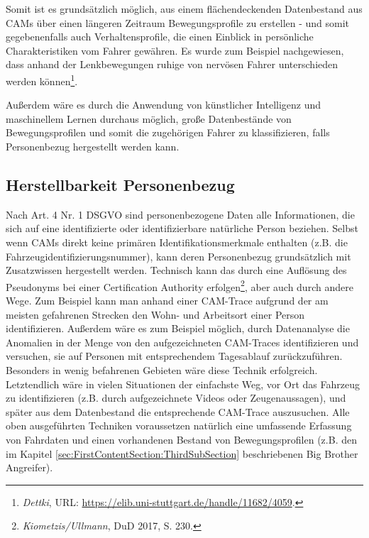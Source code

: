 Somit ist es grundsätzlich möglich, aus einem flächendeckenden Datenbestand aus CAMs über einen längeren Zeitraum Bewegungsprofile zu erstellen - und somit gegebenenfalls auch Verhaltensprofile, die einen Einblick in persönliche Charakteristiken vom Fahrer gewähren. Es\nocite{Dettki2005} wurde zum Beispiel nachgewiesen, dass anhand der Lenkbewegungen ruhige von nervösen Fahrer unterschieden werden können\footnote{\emph{Dettki}, URL: \url{https://elib.uni-stuttgart.de/handle/11682/4059}.}. 

Außerdem wäre es durch die Anwendung von künstlicher Intelligenz und maschinellem Lernen durchaus möglich, große Datenbestände von Bewegungsprofilen und somit die zugehörigen Fahrer zu klassifizieren, falls Personenbezug hergestellt werden kann. 


\subsection{Herstellbarkeit Personenbezug}
\label{sec:SecondContentSection:SecondSubsection:SecondSubSubsection}

Nach Art. 4 Nr. 1 DSGVO sind personenbezogene Daten alle Informationen, die sich auf eine identifizierte oder identifizierbare natürliche Person beziehen. Selbst wenn CAMs direkt keine primären Identifikationsmerkmale enthalten (z.B. die Fahrzeugidentifizierungsnummer), kann deren Personenbezug grundsätzlich mit Zusatzwissen hergestellt werden. Technisch kann das durch eine Auflösung des Pseudonyms bei einer Certification Authority erfolgen\footnote{\emph{Kiometzis/Ullmann}, DuD 2017, S. 230.}\nocite{Kiometzis2017}, aber auch durch andere Wege. Zum Beispiel kann man anhand einer CAM-Trace aufgrund der am meisten gefahrenen Strecken den Wohn- und Arbeitsort einer Person identifizieren. Außerdem wäre es zum Beispiel möglich, durch Datenanalyse die Anomalien in der Menge von den aufgezeichneten CAM-Traces identifizieren und versuchen, sie auf Personen mit entsprechendem Tagesablauf zurückzuführen. Besonders in wenig befahrenen Gebieten wäre diese Technik erfolgreich. Letztendlich wäre in vielen Situationen der einfachste Weg, vor Ort das Fahrzeug zu identifizieren (z.B. durch aufgezeichnete Videos oder Zeugenaussagen), und später aus dem Datenbestand die entsprechende CAM-Trace auszusuchen. Alle oben ausgeführten Techniken voraussetzen natürlich eine umfassende Erfassung von Fahrdaten und einen vorhandenen Bestand von Bewegungsprofilen (z.B. den im Kapitel \ref{sec:FirstContentSection:ThirdSubSection} beschriebenen Big Brother Angreifer).

